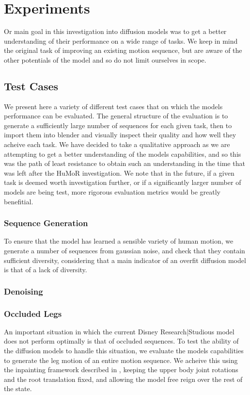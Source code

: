 \section{Experiments}
\label{sec:diffusion_experiments}

Or main goal in this investigation into diffusion models was to get a better understanding of their performance on a wide range of tasks. We keep in mind the original task of improving an existing motion sequence, but are aware of the other potentials of the model and so do not limit ourselves in scope.


\subsection{Test Cases}
We present here a variety of different test cases that on which the models performance can be evaluated. The general structure of the evaluation is to generate a sufficiently large number of sequences for each given task, then to import them into blender and visually inspect their quality and how well they acheive each task. We have decided to take a qualitative approach as we are attempting to get a better understanding of the models capabilities, and so this was the path of least resistance to obtain such an understanding in the time that was left after the HuMoR investigation. We note that in the future, if a given task is deemed worth investigation further, or if a significantly larger number of models are being test, more rigorous evaluation metrics would be greatly benefitial.

\subsubsection{Sequence Generation}
To ensure that the model has learned a sensible variety of human motion, we generate a number of sequences from gaussian noise, and check that they contain sufficient diversity, considering that a main indicator of an overfit diffusion model is that of a lack of diversity.

\subsubsection{Denoising}

\subsubsection{Occluded Legs}
An important situation in which the current Disney Research|Studious model does not perform optimally is that of occluded sequences. To test the ability of the diffusion models to handle this situation, we evaluate the models capabilities to generate the leg motion of an entire motion sequence. We acheive this using the inpainting framework described in , keeping the upper body joint rotations and the root translation fixed, and allowing the model free reign over the rest of the state.

